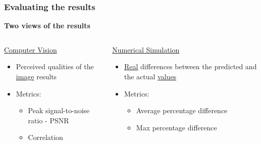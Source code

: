 \documentclass[18pt]{beamer}
\begin{document}
\begin{frame}[t]
  \frametitle{Evaluating the results}
  \begin{center}
    \textbf{\Large Two views of the results}
  \end{center}
  \vspace{-1cm}
  \begin{columns}[t]
    \begin{column}{0.5\textwidth}
      \begin{center}
        {\large \underline{Computer Vision}}
        \begin{itemize}
        \item Perceived qualities of the \underline{image} results
        \item Metrics:
          \begin{itemize}
          \item Peak signal-to-noise ratio - PSNR
          \item Correlation
          \end{itemize}
        \end{itemize}
      \end{center}
    \end{column}
    \begin{column}{0.5\textwidth}
      \begin{center}
        {\large \underline{Numerical Simulation}}
        \begin{itemize}
        \item \underline{Real} differences between the predicted and the actual \underline{values}
        \item Metrics:
          \begin{itemize}
            \item Average percentage difference
            \item Max percentage difference
          \end{itemize}
        \end{itemize}
      \end{center}  
    \end{column}
  \end{columns}
\end{frame}
\end{document}
